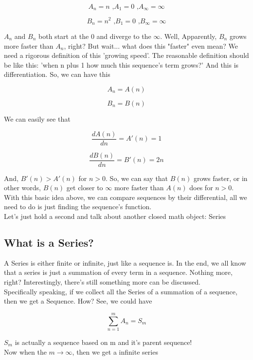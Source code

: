\documentclass{article}
\begin{document}
  \[
	  A_n = n \text{ ,} A_1 = 0 \text{ ,} A_\infty = \infty
  \]

  \[
	  B_n = n^2 \text{ ,} B_1 = 0 \text{ ,} B_\infty = \infty
  \]

  $A_n$ and $B_n$ both start at the $0$ and diverge to the $\infty$. Well, Apparently, $B_n$ grows more faster than $A_n$, right? But wait... what does this "faster" even mean? We need a rigorous definition of this 'growing speed'. The reasonable definition should be like this: 'when n plus 1 how much this sequence's term grows?' And this is differentiation. So, we can have this 

  \[
	  A_n = A(n)
  \]

  \[
	  B_n = B(n)
  \]

  We can easily see that 
  
  \[
	  \dfrac{dA(n)}{dn} = A'(n) = 1
  \]

  \[
	  \dfrac{dB(n)}{dn} = B'(n) = 2n
  \]

  And, $B'(n)>A'(n)$ for $n>0$. So, we can say that $B(n)$ grows faster, or in other words, $B(n)$ get closer to $\infty$ more faster than $A(n)$ does for $n>0$. \\

  With this basic idea above, we can compare sequences by their differential, all we need to do is just finding the sequence's function. \\

  Let's just hold a second and talk about another closed math object: Series

  \subsection{What is a Series?}
  A Series is either finite or infinite, just like a sequence is. In the end, we all know that a series is just a summation of every term in a sequence. Nothing more, right? Interestingly, there's still something more can be discussed. \\

  Specifically speaking, if we collect all the Series of a summation of a sequence, then we get a Sequence. How? See, we could have

  \[
	  \sum_{n=1}^{m} A_n = S_m
  \]

  $S_m$ is actually a sequence based on m and it's parent sequence! \\

  Now when the $m \to \infty$, then we get a infinite series
\end{document}
